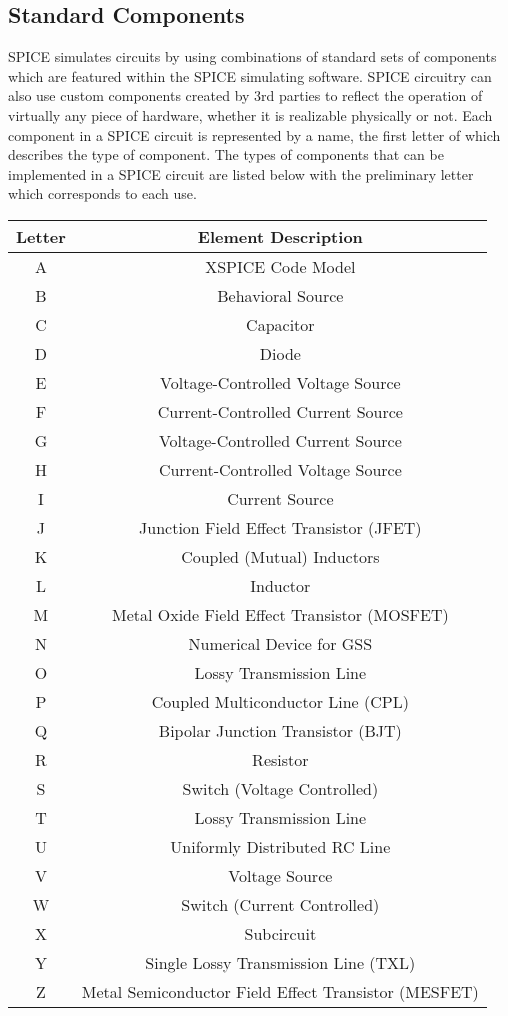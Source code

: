 \documentclass{article}
\begin{document}
\subsection{Standard Components}
SPICE simulates circuits by using combinations of standard sets of components which are featured within the SPICE simulating software. SPICE circuitry can also use custom components created by 3rd parties to reflect the operation of virtually any piece of hardware, whether it is realizable physically or not. Each component in a SPICE circuit is represented by a name, the first letter of which describes the type of component. The types of components that can be implemented in a SPICE circuit are listed below with the preliminary letter which corresponds to each use.  
\begin{center}
\begin{tabular}{||c|c||}
\hline
Letter & Element Description \\
\hline \hline
A & XSPICE Code Model \\
\hline
B & Behavioral Source \\
\hline
C & Capacitor \\
\hline
D & Diode \\
\hline
E & Voltage-Controlled Voltage Source \\
\hline
F & Current-Controlled Current Source \\
\hline
G & Voltage-Controlled Current Source \\
\hline
H & Current-Controlled Voltage Source \\
\hline
I & Current Source \\
\hline
J & Junction Field Effect Transistor (JFET) \\
\hline
K & Coupled (Mutual) Inductors \\
\hline
L & Inductor \\
\hline
M & Metal Oxide Field Effect Transistor (MOSFET) \\
\hline
N & Numerical Device for GSS \\
\hline
O & Lossy Transmission Line \\
\hline
P & Coupled Multiconductor Line (CPL) \\
\hline
Q & Bipolar Junction Transistor (BJT) \\
\hline
R & Resistor \\
\hline
S & Switch (Voltage Controlled) \\
\hline
T & Lossy Transmission Line \\
\hline
U & Uniformly Distributed RC Line \\
\hline
V & Voltage Source \\
\hline
W & Switch (Current Controlled) \\
\hline
X & Subcircuit\\
\hline
Y & Single Lossy Transmission Line (TXL) \\
\hline
Z & Metal Semiconductor Field Effect Transistor (MESFET) \\
\hline
\end{tabular}
\end{center}
\cleardoublepage
\end{document}
